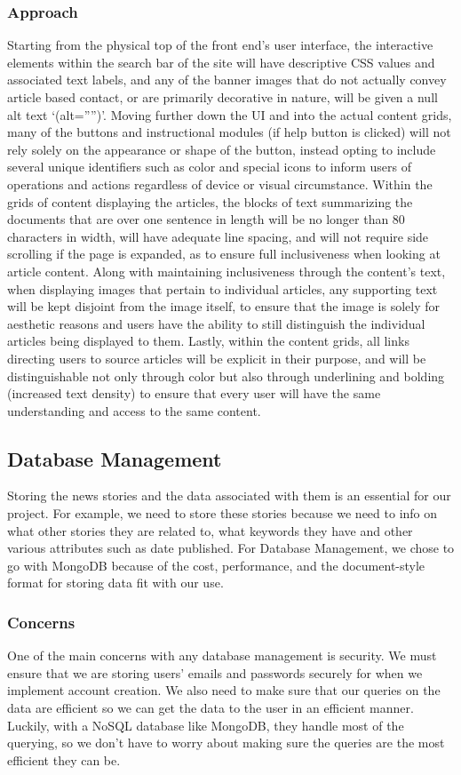 \documentclass[onecolumn, draftclsnofoot,10pt, compsoc]{IEEEtran}
\begin{document}
\subsubsection{Approach}
Starting from the physical top of the front end’s user interface, the interactive elements within the search bar of the site will have descriptive CSS values and associated text labels, and any of the banner images that do not actually convey article based contact, or are primarily decorative in nature, will be given a null alt text ‘(alt=””)’. Moving further down the UI and into the actual content grids, many of the buttons and instructional modules (if help button is clicked) will not rely solely on the appearance or shape of the button, instead opting to include several unique identifiers such as color and special icons to inform users of operations and actions regardless of device or visual circumstance. Within the grids of content displaying the articles, the blocks of text summarizing the documents that are over one sentence in length will be no longer than 80 characters in width, will have adequate line spacing, and will not require side scrolling if the page is expanded, as to ensure full inclusiveness when looking at article content. Along with maintaining inclusiveness through the content’s text, when displaying images that pertain to individual articles, any supporting text will be kept disjoint from the image itself, to ensure that the image is solely for aesthetic reasons and users have the ability to still distinguish the individual articles being displayed to them. Lastly, within the content grids, all links directing users to source articles will be explicit in their purpose, and will be distinguishable not only through color but also through underlining and bolding (increased text density) to ensure that every user will have the same understanding and access to the same content.
\subsection{Database Management}
Storing the news stories and the data associated with them is an essential for our project. For example, we need to store these stories because we need to info on what other stories they are related to, what keywords they have and other various attributes such as date published. For Database Management, we chose to go with MongoDB because of the cost, performance, and the document-style format for storing data fit with our use.
\subsubsection{Concerns}
One of the main concerns with any database management is security. We must ensure that we are storing users' emails and passwords securely for when we implement account creation. We also need to make sure that our queries on the data are efficient so we can get the data to the user in an efficient manner. Luckily, with a NoSQL database like MongoDB, they handle most of the querying, so we don't have to worry about making sure the queries are the most efficient they can be.
\end{document}
